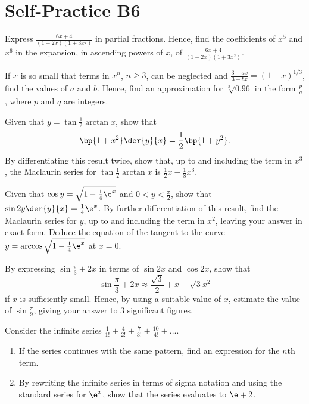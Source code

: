\section{Self-Practice B6}

\begin{problem}
    Express $\frac{6x+4}{(1-2x)(1+3x^{2})}$ in partial fractions. Hence, find the coefficients of $x^{5}$ and $x^{6}$ in the expansion, in ascending powers of $x$, of $\frac{6x+4}{(1-2x)(1+3x^{2})}$.
\end{problem}

\begin{problem}
    If $x$ is so small that terms in $x^n$, $n \geq 3$, can be neglected and $\frac{3+ax}{3+bx}=(1-x)^{1/3}$, find the values of $a$ and $b$. Hence, find an approximation for $\sqrt[3]{0.96}$ in the form $\frac{p}{q}$, where $p$ and $q$ are integers.
\end{problem}

\begin{problem}
    Given that $y=\tan{\frac12 \arctan x}$, show that \[\bp{1 + x^2} \der{y}{x} = \frac12 \bp{1 + y^2}.\] By differentiating this result twice, show that, up to and including the term in $x^{3}$, the Maclaurin series for $\tan{\frac12 \arctan x}$ is $\frac12x - \frac18 x^3$.
\end{problem}

\begin{problem}
    Given that $\cos y=\sqrt{1-\frac{1}{4} \e^x}$ and $0<y<\frac{\pi}{2}$, show that $\sin 2y \der{y}{x} = \frac14 \e^x$. By further differentiation of this result, find the Maclaurin series for $y$, up to and including the term in $x^{2}$, leaving your answer in exact form. Deduce the equation of the tangent to the curve $y=\arccos \sqrt{1-\frac{1}{4} \e^x}$ at $x=0$.
\end{problem}

\begin{problem}
    By expressing $\sin{\frac\pi3 + 2x}$ in terms of $\sin2x$ and $\cos2x$, show that \[\sin{\frac\pi3 + 2x} \approx \frac{\sqrt{3}}{2} + x - \sqrt{3}x^2\] if $x$ is sufficiently small. Hence, by using a suitable value of $x$, estimate the value of $\sin\frac{\pi}{9}$, giving your answer to 3 significant figures.
\end{problem}

\begin{problem}[\chili]
    Consider the infinite series $\frac{1}{1!}+\frac{4}{2!}+\frac{7}{3!}+\frac{10}{4!}+\dots$.
    
    \begin{enumerate}
        \item If the series continues with the same pattern, find an expression for the $n$th term.
        \item By rewriting the infinite series in terms of sigma notation and using the standard series for $\e^{x}$, show that the series evaluates to $\e+2$.
    \end{enumerate}
\end{problem}

